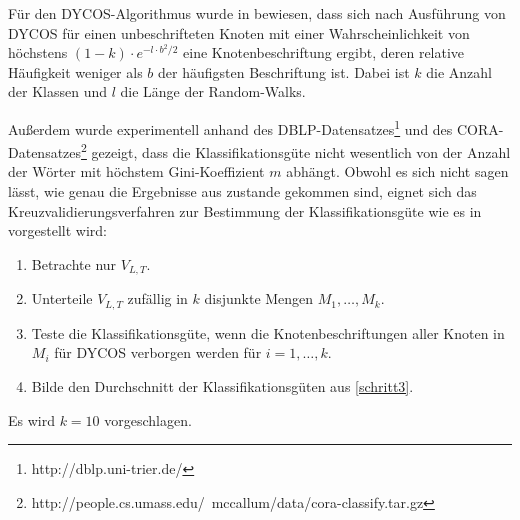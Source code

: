 Für den DYCOS-Algorithmus wurde in \cite{aggarwal2011} bewiesen,
dass sich nach Ausführung von DYCOS für einen unbeschrifteten
Knoten mit einer Wahrscheinlichkeit von höchstens
$(1-k)\cdot e^{-l \cdot b^2 / 2}$ eine Knotenbeschriftung ergibt, deren
relative Häufigkeit weniger als $b$ der häufigsten Beschriftung ist.
Dabei ist $k$ die Anzahl der Klassen und $l$ die Länge der 
Random-Walks.

Außerdem wurde experimentell anhand des DBLP-Datensatzes\footnote{http://dblp.uni-trier.de/}
und des CORA-Datensatzes\footnote{http://people.cs.umass.edu/~mccallum/data/cora-classify.tar.gz}
gezeigt, dass die Klassifikationsgüte nicht wesentlich von der Anzahl der Wörter mit
höchstem Gini-Koeffizient $m$ abhängt.  Obwohl es sich nicht sagen lässt,
wie genau die Ergebnisse aus \cite{aggarwal2011} zustande gekommen sind,
eignet sich das Kreuzvalidierungsverfahren zur Bestimmung der Klassifikationsgüte
wie es in \cite{Lavesson,Stone1974} vorgestellt wird:
\begin{enumerate}
    \item Betrachte nur $V_{L,T}$.
    \item Unterteile $V_{L,T}$ zufällig in $k$ disjunkte Mengen $M_1, \dots, M_k$.
    \item \label{schritt3} Teste die Klassifikationsgüte, wenn die Knotenbeschriftungen
          aller Knoten in $M_i$ für DYCOS verborgen werden für $i=1,\dots, k$.
    \item Bilde den Durchschnitt der Klassifikationsgüten aus \cref{schritt3}.
\end{enumerate}

Es wird $k=10$ vorgeschlagen.


